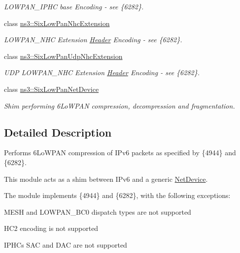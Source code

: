\begin{DoxyCompactItemize}
\begin{DoxyCompactList}\small\item\em L\+O\+W\+P\+A\+N\+\_\+\+I\+P\+HC base Encoding -\/ see \{6282\}. \end{DoxyCompactList}\item 
class \hyperlink{classns3_1_1SixLowPanNhcExtension}{ns3\+::\+Six\+Low\+Pan\+Nhc\+Extension}
\begin{DoxyCompactList}\small\item\em L\+O\+W\+P\+A\+N\+\_\+\+N\+HC Extension \hyperlink{classns3_1_1Header}{Header} Encoding -\/ see \{6282\}. \end{DoxyCompactList}\item 
class \hyperlink{classns3_1_1SixLowPanUdpNhcExtension}{ns3\+::\+Six\+Low\+Pan\+Udp\+Nhc\+Extension}
\begin{DoxyCompactList}\small\item\em U\+DP L\+O\+W\+P\+A\+N\+\_\+\+N\+HC Extension \hyperlink{classns3_1_1Header}{Header} Encoding -\/ see \{6282\}. \end{DoxyCompactList}\item 
class \hyperlink{classns3_1_1SixLowPanNetDevice}{ns3\+::\+Six\+Low\+Pan\+Net\+Device}
\begin{DoxyCompactList}\small\item\em Shim performing 6\+Lo\+W\+P\+AN compression, decompression and fragmentation. \end{DoxyCompactList}\end{DoxyCompactItemize}


\subsection{Detailed Description}
Performs 6\+Lo\+W\+P\+AN compression of I\+Pv6 packets as specified by \{4944\} and \{6282\}. 

This module acts as a shim between I\+Pv6 and a generic \hyperlink{classns3_1_1NetDevice}{Net\+Device}.

The module implements \{4944\} and \{6282\}, with the following exceptions\+: 
\begin{DoxyItemize}
\item M\+E\+SH and L\+O\+W\+P\+A\+N\+\_\+\+B\+C0 dispatch types are not supported  
\item H\+C2 encoding is not supported  
\item I\+P\+HC\textquotesingle{}s S\+AC and D\+AC are not supported  
\end{DoxyItemize}